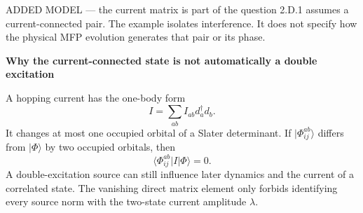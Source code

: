 \documentclass[11pt,a4paper]{article}
\newcommand{\ket}[1]{\lvert #1\rangle}
\newcommand{\bra}[1]{\langle #1\rvert}
\newcommand{\smallheading}[1]{\par\Needspace{6\baselineskip}\medskip\textbf{#1}\par}
\begin{document}
\begin{redbox}{ADDED MODEL --- the current matrix is part of the question}
2.D.1 assumes a current-connected pair. The example isolates interference. It does not specify how the physical MFP evolution generates that pair or its phase.
\end{redbox}
\smallheading{Why the current-connected state is not automatically a double excitation}
A hopping current has the one-body form
\[
I=\sum_{ab}I_{ab}d_a^\dagger d_b.
\]
It changes at most one occupied orbital of a Slater determinant. If $\ket{\Phi_{ij}^{ab}}$ differs from $\ket\Phi$ by two occupied orbitals, then
\[
\bra{\Phi_{ij}^{ab}}I\ket\Phi=0.
\]
A double-excitation source can still influence later dynamics and the current of a correlated state. The vanishing direct matrix element only forbids identifying every source norm with the two-state current amplitude $\lambda$.
\end{document}
